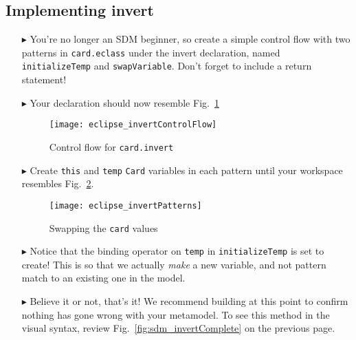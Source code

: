 \newpage
\hypertarget{invertCard tex}{}
\subsection{Implementing invert}
\texHeader

\begin{itemize}

\item[$\blacktriangleright$] You're no longer an SDM beginner, so create a simple control flow with two patterns in \texttt{card.eclass} under the invert
declaration, named \texttt{initializeTemp} and \texttt{swapVariable}. Don't forget to include a return statement!

\item[$\blacktriangleright$] Your declaration should now resemble Fig.~\ref{fig:eclipse_invert}

\begin{figure}[htbp]
\begin{center}
  \texttt{[image: eclipse\_invertControlFlow]}
  \caption{Control flow for \texttt{card.invert}}  
  \label{fig:eclipse_invert}
\end{center}
\end{figure}

\item[$\blacktriangleright$] Create \texttt{this} and \texttt{temp} \texttt{Card} variables in each pattern until your workspace resembles
Fig.~\ref{fig:invertPatterns}.

\begin{figure}[htbp]
\begin{center}
  \texttt{[image: eclipse\_invertPatterns]}
  \caption{Swapping the \texttt{card} values}  
  \label{fig:invertPatterns}
\end{center}
\end{figure}

\item[$\blacktriangleright$] Notice that the binding operator on \texttt{temp} in \texttt{initializeTemp} is set to create! This is so that we actually \emph{make} a new
variable, and not pattern match to an existing one in the model.

\item[$\blacktriangleright$] Believe it or not, that's it! We recommend building at this point to confirm nothing has gone wrong with your metamodel. To
see this method in the visual syntax, review Fig.~\ref{fig:sdm_invertComplete} on the previous page.

\end{itemize}
